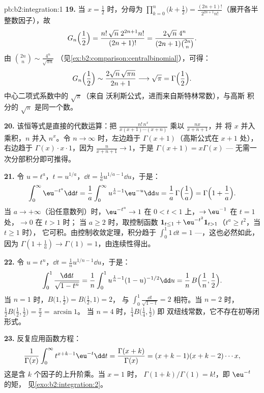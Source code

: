 \begin{solution}{pb:b2:integration:1}
\textbf{19.} 当 $x = \frac12$ 时，分母为
$\prod_{k=0}^n\bigl(k+\frac12\bigr) =
\frac{(2n+1)!}{2^{2n+1}n!}$（展开各半整数因子），故
\[
G_n\Bigl(\frac12\Bigr)
= \frac{n!\,\sqrt n\;2^{2n+1}n!}{(2n+1)!}
= \frac{2\sqrt n\;4^n}{(2n+1)\binom{2n}{n}} .
\]
由 $\binom{2n}{n} \sim \frac{4^n}{\sqrt{\pi n}}$
（见\cref{ex:b2:comparison:centralbinomial}），可得：
\[
G_n\Bigl(\frac12\Bigr)
\sim \frac{2\sqrt n\,\sqrt{\pi n}}{2n+1}
\longrightarrow \sqrt\pi = \Gamma\Bigl(\frac12\Bigr) .
\]
中心二项式系数中的 $\sqrt\pi$（来自
沃利斯公式，进而来自斯特林常数），与高斯
积分的 $\sqrt\pi$ 是同一个数。

\textbf{20.} 该恒等式是直接的代数运算：把
$\frac{n!\,n^x}{x(x+1)\cdots(x+n)}$ 乘以 $\frac{nx}{x+n+1}$，并
将 $x$ 并入乘积，$n$ 并入 $n^x$。令 $n \to
\infty$ 时，左边趋于 $\Gamma(x+1)$（高斯公式在 $x+1$ 处），
右边趋于 $\Gamma(x)\cdot x\cdot 1$，因为
$\frac{n}{x+n+1} \to 1$，于是 $\Gamma(x+1) = x\Gamma(x)$ ---
无需一次分部积分即可推得。

\textbf{21.} 令 $u = t^a$，$t = u^{1/a}$，$\dd t = \frac1a
u^{1/a - 1}\dd u$，于是：
\[
\int_0^\infty \eu^{-t^a}\dd t
= \frac1a\int_0^\infty u^{\frac1a - 1}\eu^{-u}\dd u
= \frac1a\,\Gamma\Bigl(\frac1a\Bigr)
= \Gamma\Bigl(1 + \frac1a\Bigr) .
\]
当 $a \to +\infty$（沿任意数列）时，$\eu^{-t^a} \to 1$ 在
$0 < t < 1$ 上，$\to \eu^{-1}$ 在 $t = 1$ 处，$\to 0$ 在 $t > 1$ 时；
当 $a \geq 2$ 时，取控制函数 $\mathbf 1_{t \leq 1} +
\eu^{-t^2}\mathbf 1_{t > 1}$（$t^a \geq t^2$，当 $t \geq 1$ 时），
它可积。由控制收敛定理，积分趋于
$\int_0^1 1\,\dd t = 1$ ---，这也必然如此，因为 $\Gamma(1 +
\frac1a) \to \Gamma(1) = 1$，由连续性得出。

\textbf{22.} 令 $u = t^n$，$\dd t = \frac1n u^{1/n - 1}\dd
u$，于是：
\[
\int_0^1 \frac{\dd t}{\sqrt{1-t^n}}
= \frac1n\int_0^1 u^{\frac1n-1}(1-u)^{-1/2}\dd u
= \frac1n\,B\Bigl(\frac1n, \frac12\Bigr) .
\]
当 $n = 1$ 时，$B\bigl(1,\frac12\bigr) = B\bigl(\frac12,1\bigr) = 2$，
与 $\int_0^1\frac{\dd t}{\sqrt{1-t}} = 2$ 相符。当 $n = 2$ 时，
$\frac12 B\bigl(\frac12,\frac12\bigr) = \frac\pi2 = \arcsin 1$。
当 $n = 4$ 时，$\frac14 B\bigl(\frac14,\frac12\bigr)$ 即
双纽线常数，它不存在初等闭形式。

\textbf{23.} 反复应用函数方程：
\[
\frac{1}{\Gamma(x)}\int_0^\infty t^{x+k-1}\eu^{-t}\dd t
= \frac{\Gamma(x+k)}{\Gamma(x)}
= (x+k-1)(x+k-2)\cdots x ,
\]
这是含 $k$ 个因子的上升阶乘。当 $x = 1$ 时，
$\Gamma(1+k)/\Gamma(1) = k!$，即 $\eu^{-t}$ 的矩，
见\cref{exo:b2:integration:2}。


\end{solution}
